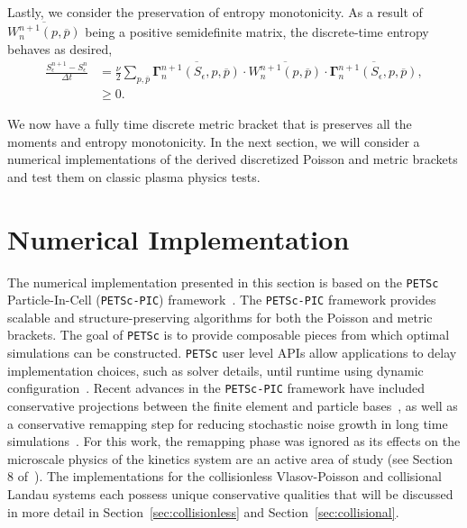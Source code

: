 \documentclass[preprint,12pt]{elsarticle}
\theoremstyle{definition}
\begin{document}
Lastly, we consider the preservation of entropy monotonicity. As a result of $\overline{W_{n}^{n+1}(p, \overline{p})}$ being a positive semidefinite matrix, the discrete-time entropy behaves as desired,
\begin{align*}
\frac{S_{\epsilon}^{n+1}-S_{\epsilon}^{n}}{\Delta t}&=\frac{\nu}{2} \sum_{p, \overline{p}} \overline{\boldsymbol{\Gamma}_{n}^{n+1}(S_{\epsilon}, p, \overline{p})} \cdot \overline{W_{n}^{n+1}(p, \overline{p})} \cdot \overline{\boldsymbol{\Gamma}_{n}^{n+1}\left(S_{\epsilon}, p, \overline{p}\right)}, \\
&\geq 0.
\end{align*}

We now have a fully time discrete metric bracket that is preserves all the moments and entropy monotonicity. In the next section, we will consider a numerical implementations of the derived discretized Poisson and metric brackets and test them on classic plasma physics tests.


\section{\label{sec:NumImp}Numerical Implementation}

The numerical implementation presented in this section is based on the \texttt{PETSc} Particle-In-Cell (\texttt{PETSc-PIC}) framework~\cite{Finn2023}. The \texttt{PETSc-PIC} framework provides scalable and structure-preserving algorithms for both the Poisson and metric brackets. The goal of \texttt{PETSc} is to provide composable pieces from which optimal simulations can be constructed. \texttt{PETSc} user level APIs allow applications to delay implementation choices, such as solver details, until runtime using dynamic configuration~\cite{BrownKnepleySmith14}. Recent advances in the \texttt{PETSc-PIC} framework have included conservative projections between the finite element and particle bases~\cite{Pusztay2022}, as well as a conservative remapping step for reducing stochastic noise growth in long time simulations~\cite{Adams2025}. For this work, the remapping phase was ignored as its effects on the microscale physics of the kinetics system are an active area of study (see Section 8 of~\cite{Adams2025}). The implementations for the collisionless Vlasov-Poisson and collisional Landau systems each possess unique conservative qualities that will be discussed in more detail in Section~\ref{sec:collisionless} and Section~\ref{sec:collisional}.
\end{document}
